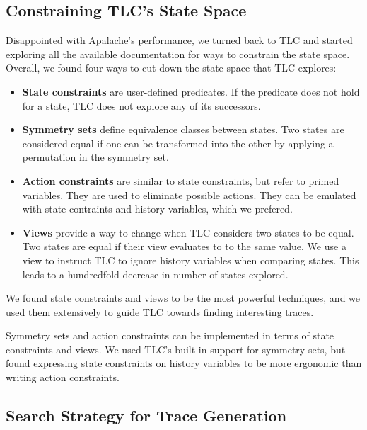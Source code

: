 \documentclass[a4paper]{article}
\begin{document}
\subsection{Constraining TLC's State Space}

Disappointed with Apalache's performance, we turned back to TLC and started exploring all the available documentation for ways to constrain the state space.
%
Overall, we found four ways to cut down the state space that TLC explores:

\begin{itemize}
    \item \textbf{State constraints} are user-defined predicates.
    If the predicate does not hold for a state, TLC does not explore any of its successors.

    \item \textbf{Symmetry sets} define equivalence classes between states.
    Two states are considered equal if one can be transformed into the other by applying a permutation in the symmetry set.

    \item \textbf{Action constraints} are similar to state constraints, but refer to primed variables.
    They are used to eliminate possible actions.
    They can be emulated with state contraints and history variables, which we prefered.
    
    \item \textbf{Views} provide a way to change when TLC considers two states to be equal.
    Two states are equal if their view evaluates to to the same value.
    We use a view to instruct TLC to ignore history variables when comparing states.
    This leads to a hundredfold decrease in number of states explored.
\end{itemize}

We found state constraints and views to be the most powerful techniques, and we used them extensively to guide TLC towards finding interesting traces.

Symmetry sets and action constraints can be implemented in terms of state constraints and views.
%
We used TLC's built-in support for symmetry sets, but found expressing state constraints on history variables to be more ergonomic than writing action constraints.

\subsection{Search Strategy for Trace Generation}
\end{document}
